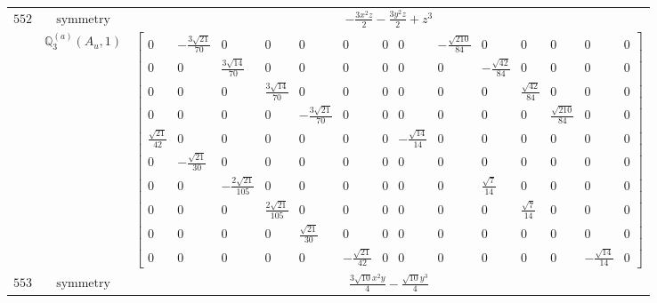 \documentclass[fleqn,8pt,landscape]{jsarticle}
\begin{document}
\begin{longtable}{ccc}
$ 552 $ & $ \text{symmetry} $ & $ - \frac{3 x^{2} z}{2} - \frac{3 y^{2} z}{2} + z^{3} $ \\
$  $ & $ \mathbb{Q}_{3}^{(a)}(A_{u},1) $ & $ \begin{bmatrix} 0 & - \frac{3 \sqrt{21}}{70} & 0 & 0 & 0 & 0 & 0 & 0 & - \frac{\sqrt{210}}{84} & 0 & 0 & 0 & 0 & 0 \\ 0 & 0 & \frac{3 \sqrt{14}}{70} & 0 & 0 & 0 & 0 & 0 & 0 & - \frac{\sqrt{42}}{84} & 0 & 0 & 0 & 0 \\ 0 & 0 & 0 & \frac{3 \sqrt{14}}{70} & 0 & 0 & 0 & 0 & 0 & 0 & \frac{\sqrt{42}}{84} & 0 & 0 & 0 \\ 0 & 0 & 0 & 0 & - \frac{3 \sqrt{21}}{70} & 0 & 0 & 0 & 0 & 0 & 0 & \frac{\sqrt{210}}{84} & 0 & 0 \\ \frac{\sqrt{21}}{42} & 0 & 0 & 0 & 0 & 0 & 0 & - \frac{\sqrt{14}}{14} & 0 & 0 & 0 & 0 & 0 & 0 \\ 0 & - \frac{\sqrt{21}}{30} & 0 & 0 & 0 & 0 & 0 & 0 & 0 & 0 & 0 & 0 & 0 & 0 \\ 0 & 0 & - \frac{2 \sqrt{21}}{105} & 0 & 0 & 0 & 0 & 0 & 0 & \frac{\sqrt{7}}{14} & 0 & 0 & 0 & 0 \\ 0 & 0 & 0 & \frac{2 \sqrt{21}}{105} & 0 & 0 & 0 & 0 & 0 & 0 & \frac{\sqrt{7}}{14} & 0 & 0 & 0 \\ 0 & 0 & 0 & 0 & \frac{\sqrt{21}}{30} & 0 & 0 & 0 & 0 & 0 & 0 & 0 & 0 & 0 \\ 0 & 0 & 0 & 0 & 0 & - \frac{\sqrt{21}}{42} & 0 & 0 & 0 & 0 & 0 & 0 & - \frac{\sqrt{14}}{14} & 0 \end{bmatrix} $ \\ \hline
$ 553 $ & $ \text{symmetry} $ & $ \frac{3 \sqrt{10} x^{2} y}{4} - \frac{\sqrt{10} y^{3}}{4} $ \\

\end{longtable}
\end{document}
